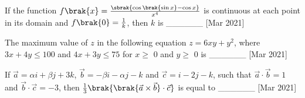 \item If the function $f\brak{x} = \frac{\sbrak{\cos{\brak{\sin{x}}} - \cos{x}}}{x^4}$ is continuous at each point in its domain and $f\brak{0} = \frac{1}{k}$, then $k$ is \_\_\_\_\_\_ \hfill[Mar 2021] \\
\item The maximum value of $z$ in the following equation $z = 6xy + y^2$, where $3x + 4y \leq 100$ and $4x + 3y \leq 75$ for $x \geq$ 0 and $y \geq$ 0 is \_\_\_\_\_\_ \hfill[Mar 2021] \\
\item If $\vec{a} = \alpha i + \beta j + 3k$, $\vec{b} = -\beta i - \alpha j - k$ and $\vec{c} = i -2j - k$, such that $\vec{a}\cdot\vec{b} = 1$ and $\vec{b}\cdot\vec{c} = -3$, then $\frac{1}{3}\brak{\brak{\vec{a}\times\vec{b}}\cdot\vec{c}}$ is equal to \_\_\_\_\_\_ \hfill[Mar 2021] \\
